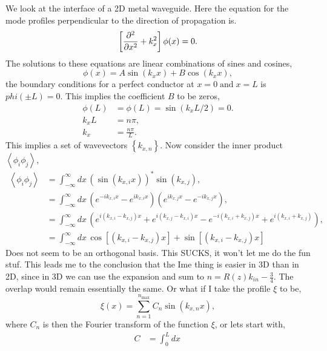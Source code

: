 \documentclass{article}
\begin{document}
\newpage
We look at the interface of a 2D metal waveguide. Here the equation for the mode profiles perpendicular to the direction of propagation is.
\begin{equation*}
  \left[\pdv[2]{}{x}+k_x^2\right]\phi(x)=0.
\end{equation*}
The solutions to these equations are linear combinations of sines and cosines,
\begin{equation*}
  \phi(x)=A\sin(k_xx)+B\cos(k_xx),
\end{equation*}
the boundary conditions for a perfect conductor at $x=0\;\text{and}\;x=L$ is $phi(\pm L)=0$. This implies the coefficient $B$ to be zeros,
\begin{align*}
  \phi(L)&=\phi(L)=\sin(k_xL/2)=0.\\
  k_xL&=n\pi,\\
  k_x&=\frac{n\pi}{L}.
\end{align*}
This implies a set of wavevectors $\left\{k_{x,n}\right\}$. Now consider the inner product $\left<\phi_i\phi_j\right>$,
\begin{align*}
  \left<\phi_i\phi_j\right>&=\int_{-\infty}^{\infty}dx\,\left(\sin(k_{x,i}x)\right)^*\sin(k_{x,j}),\\
  &=\int_{-\infty}^{\infty}dx\,\left(e^{-ik_{x,i}x}-e^{ik_{x,i}x}\right)\left(e^{ik_{x,j}x}-e^{-ik_{x,j}x}\right),\\
  &=\int_{-\infty}^{\infty}dx\,\left(e^{i(k_{x,i}-k_{x,j})x}+e^{i(k_{x,j}-k_{x,i})x}-e^{-i(k_{x,i}+k_{x,j})x}+e^{i(k_{x,i}+k_{x,j})}\right),\\
  &=\int_{-\infty}^{\infty}dx\,\cos\left[(k_{x,i}-k_{x,j})x\right]+\sin\left[(k_{x,i}-k_{x,j})x\right]
\end{align*}
Does not seem to be an orthogonal basis. This SUCKS, it won't let me do the fun stuf. This leads me to the conclusion that the Ime thing is easier in 3D than in 2D, since in 3D we can use the expansion and sum to $n=R(z)k_{in}-\frac{3}{4}$. The overlap would remain essentially the same. Or what if I take the profile $\xi$ to be,
\begin{equation*}
  \xi(x)=\sum_{n=1}^{n_{\text{max}}}C_n\sin(k_{x,n}x),
\end{equation*}
where $C_n$ is then the Fourier transform of the function $\xi$, or lets start with,
\begin{align*}
  C&=\int_0^{L}dx\,
\end{align*}

\newpage
\end{document}
